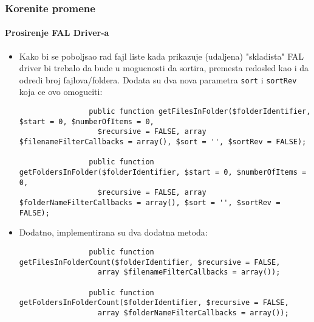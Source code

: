 \begin{frame}[fragile]
	\frametitle{Korenite promene}
	\framesubtitle{Prosirenje FAL Driver-a}

	\lstset{basicstyle=\tiny\ttfamily}

	\begin{itemize}
		\item Kako bi se poboljsao rad fajl liste kada prikazuje (udaljena) "skladista" 
			FAL driver bi trebalo da bude u mogucnosti da sortira, premesta redosled kao i da odredi broj fajlova/foldera.
			Dodata su dva nova parametra \texttt{sort} i \texttt{sortRev} koja ce ovo omoguciti:

			\begin{lstlisting}
				public function getFilesInFolder($folderIdentifier, $start = 0, $numberOfItems = 0,
				  $recursive = FALSE, array $filenameFilterCallbacks = array(), $sort = '', $sortRev = FALSE);

				public function getFoldersInFolder($folderIdentifier, $start = 0, $numberOfItems = 0,
				  $recursive = FALSE, array $folderNameFilterCallbacks = array(), $sort = '', $sortRev = FALSE);
			\end{lstlisting}

		\item Dodatno, implementirana su dva dodatna metoda:

			\begin{lstlisting}
				public function getFilesInFolderCount($folderIdentifier, $recursive = FALSE,
				  array $filenameFilterCallbacks = array());

				public function getFoldersInFolderCount($folderIdentifier, $recursive = FALSE,
				  array $folderNameFilterCallbacks = array());
			\end{lstlisting}

	\end{itemize}

\end{frame}

